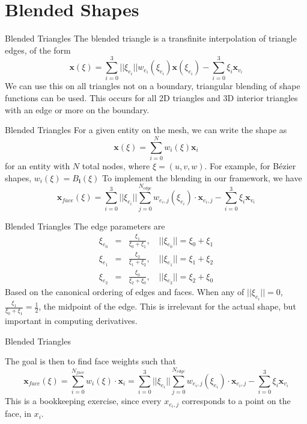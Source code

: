 \documentclass[12pt]{beamer}
\begin{document}
\section{Blended Shapes}
\begin{frame}{Blended Triangles}
The blended triangle is a transfinite interpolation of triangle edges, of the form
\[\mathbf{x}(\xi) = \sum_{i=0}^{3}||\xi_{e_i}||w_{e_i}(\xi_{e_i})\mathbf{x}(\xi_{e_i}) - \sum_{i=0}^{3}\xi_i\mathbf{x}_{v_i}\]
We can use this on all triangles not on a boundary, triangular blending of shape functions can be used. This occurs for all 2D triangles and 3D interior triangles with an edge or more on the boundary.
\end{frame}
\begin{frame}{Blended Triangles}
For a given entity on the mesh, we can write the shape as
\[ \mathbf{x}(\xi) = \sum_{i=0}^N w_i(\xi) \mathbf{x}_i \]
for an entity with $N$ total nodes, where $\xi = (u,v,w)$. For example, for B{\'e}zier shapes, $w_i(\xi) = B_{\mathbf{i}}(\xi)$ To implement the blending in our framework, we have 
\[\mathbf{x}_{face}(\xi) = \sum_{i=0}^{3}||\xi_{e_i}||\sum_{j=0}^{N_{edge}}w_{e_i,j}(\xi_{e_i})\cdot\mathbf{x}_{e_i,j}- \sum_{i=0}^{3}\xi_i\mathbf{x}_{v_i}\]
\end{frame}
\begin{frame}{Blended Triangles}
The edge parameters are
\begin{eqnarray*} 
\xi_{e_0} & = & \frac{\xi_1}{\xi_0+\xi_1},\quad ||\xi_{e_0}|| = \xi_0+\xi_1 \\
\xi_{e_1} & = & \frac{\xi_2}{\xi_1+\xi_2},\quad ||\xi_{e_1}|| = \xi_1+\xi_2 \\
\xi_{e_2} & = & \frac{\xi_0}{\xi_2+\xi_0},\quad ||\xi_{e_2}|| = \xi_2+\xi_0 
\end{eqnarray*}
Based on the canonical ordering of edges and faces. When any of $||\xi_{e_i}|| = 0$, $\frac{\xi_1}{\xi_0+\xi_1} = \frac{1}{2}$, the midpoint of the edge. This is irrelevant for the actual shape, but important in computing derivatives.
\end{frame}
\begin{frame}{Blended Triangles}

The goal is then to find face weights such that \[\mathbf{x}_{face}(\xi) = \sum_{i=0}^{N_{face}} w_i(\xi) \cdot \mathbf{x}_i = \sum_{i=0}^{3}||\xi_{e_i}||\sum_{j=0}^{N_{edge}}w_{e_i,j}(\xi_{e_i})\cdot\mathbf{x}_{e_i,j}- \sum_{i=0}^{3}\xi_i\mathbf{x}_{v_i} \] 
This is a bookkeeping exercise, since every $x_{e_i,j}$ corresponds to a point on the face, in $x_i$. 
\end{frame}
\end{document}
